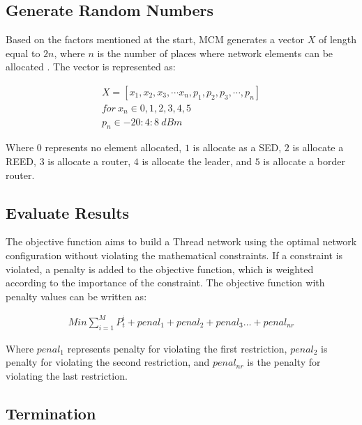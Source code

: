 \subsection{Generate Random Numbers}

Based on the factors mentioned at the start, \gls{MCM} generates a vector $X$ of length equal to $2n$, where $n$ is the number of places where network elements can be allocated \cite{1576539}. The vector is represented as:

\begin{equation}\label{eq:vector_x}
    \begin{split}
        X=\left[x_1,x_2,x_3,\cdots x_n,p_1,p_2,p_3,\cdots,p_n\right] \\
        for{\ x}_n\in0,1,2,3,4,5 \\
        p_n\in-20:4:8\ dBm
    \end{split}
\end{equation}

    Where $0$ represents no element allocated, $1$ is allocate as a \gls{SED}, $2$ is allocate a \gls{REED}, $3$ is allocate a router, $4$ is allocate the leader, and $5$ is allocate a border router.
\vspace{2mm}

\subsection{Evaluate Results}

The objective function aims to build a Thread network using the optimal network configuration without violating the mathematical constraints. If a constraint is violated, a penalty is added to the objective function, which is weighted according to the importance of the constraint. The objective function with penalty values can be written as:

\begin{equation}\label{eq:objective_function}
    \begin{aligned}
        Min\sum_{i=1}^{M}P_t^i+penal_1+penal_2+penal_3\ldots+penal_{nr}
    \end{aligned}
\end{equation}

    Where $penal_1$ represents penalty for violating the first restriction, $penal_2$ is penalty for violating the second restriction, and $penal_{nr}$ is the penalty for violating the last restriction.
\vspace{2mm}

\subsection{Termination}

